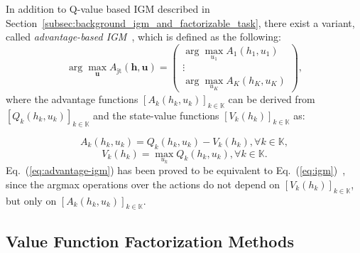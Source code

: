 \documentclass[twoside,11pt]{article}
\newcommand{\jointaction}{\mathbf{u}}
\newcommand{\action}{u}
\newcommand{\jointobservationhistory}{\mathbf{h}}
\newcommand{\observationhistory}{h}
\newcommand{\agentspace}{\mathbb{K}}
\newcommand{\agentcounter}{k}
\newcommand{\numberofagents}{K}
\newcommand{\utilityadv}{A}
\newcommand{\joint}{\mathrm{jt}}
\begin{document}
In addition to Q-value based IGM described in Section~\ref{subsec:background_igm_and_factorizable_task}, there exist a variant, called \textit{advantage-based IGM}~\citep{Wang2020QPLEX}, which is defined as the following:
\begin{equation}
\arg\max_\jointaction{} \utilityadv{}_{\joint{}}(\jointobservationhistory{},\jointaction{}) =
\begin{pmatrix}
\arg\max_{\action{}_1} \utilityadv{}_1(\observationhistory{}_1,\action{}_1)\\
\vdots \\
\arg\max_{\action{}_\numberofagents{}} \utilityadv{}_\numberofagents{}(\observationhistory{}_\numberofagents{},\action{}_\numberofagents{})
\end{pmatrix},
\label{eq:advantage-igm}
\end{equation}
where the advantage functions $[A_\agentcounter{}(\observationhistory{}_\agentcounter{},\action{}_\agentcounter{})]_{\agentcounter{}\in\agentspace{}}$ can be derived from $[Q_\agentcounter{}(\observationhistory{}_\agentcounter{},\action{}_\agentcounter{})]_{\agentcounter{}\in\agentspace{}}$ and the state-value functions $[V_\agentcounter{}(\observationhistory{}_\agentcounter{})]_{\agentcounter{}\in\agentspace{}}$ as:

\begin{equation}
A_\agentcounter{}(\observationhistory{}_\agentcounter{},\action{}_\agentcounter{})=Q_\agentcounter{}(\observationhistory{}_\agentcounter{},\action{}_\agentcounter{})-V_\agentcounter{}(\observationhistory{}_\agentcounter{}), \forall\agentcounter{}\in\agentspace{},
\end{equation}
\begin{equation}
V_\agentcounter{}(\observationhistory{}_\agentcounter{})=\max_{\action{}_\agentcounter{}}Q_\agentcounter{}(\observationhistory{}_\agentcounter{},\action{}_\agentcounter{}), \forall\agentcounter{}\in\agentspace{}.
\end{equation}
Eq.~(\ref{eq:advantage-igm}) has been proved to be equivalent to Eq.~(\ref{eq:igm})~\citep{Wang2020QPLEX}, since the argmax operations over the actions do not depend on $[V_\agentcounter{}(\observationhistory{}_\agentcounter{})]_{\agentcounter{}\in\agentspace{}}$, but only on $[A_\agentcounter{}(\observationhistory{}_\agentcounter{},\action{}_\agentcounter{})]_{\agentcounter{}\in\agentspace{}}$.



\subsection{Value Function Factorization Methods}
\label{subsec:background_value_factorization_methods}
\end{document}
